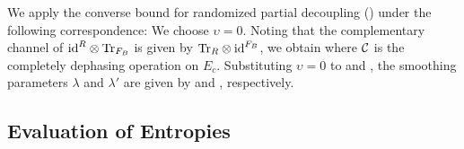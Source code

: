 \documentclass[journal]{IEEEtran}
\begin{document}
We apply the converse bound for randomized partial decoupling () under the following correspondence:
We choose $\upsilon=0$. Noting that the complementary channel of ${\rm id}^R\otimes{\rm Tr}_{F_B}$ is given by ${\rm Tr}_R\otimes{\rm id}^{F_B}$,
we obtain
where ${\mathcal C}$ is the completely dephasing operation on $E_c$.
Substituting $\upsilon=0$ to  and , the smoothing parameters $\lambda$ and $\lambda'$ are given by  and , respectively.



\subsection{Evaluation of Entropies}
\end{document}
